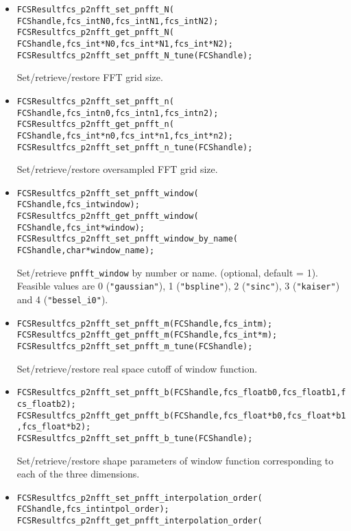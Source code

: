 \begin{itemize}
  \item
\begin{alltt}
FCSResult fcs_p2nfft_set_pnfft_N(
    FCS handle, fcs_int N0, fcs_int N1, fcs_int N2);
FCSResult fcs_p2nfft_get_pnfft_N(
    FCS handle, fcs_int* N0, fcs_int* N1, fcs_int* N2);
FCSResult fcs_p2nfft_set_pnfft_N_tune(FCS handle);
\end{alltt}
    Set/retrieve/restore FFT grid size.
  \item
\begin{alltt}
FCSResult fcs_p2nfft_set_pnfft_n(
    FCS handle, fcs_int n0, fcs_int n1, fcs_int n2);
FCSResult fcs_p2nfft_get_pnfft_n(
    FCS handle, fcs_int* n0, fcs_int* n1, fcs_int* n2);
FCSResult fcs_p2nfft_set_pnfft_n_tune(FCS handle);
\end{alltt}
    Set/retrieve/restore oversampled FFT grid size.
  \item
\begin{alltt}
FCSResult fcs_p2nfft_set_pnfft_window(
    FCS handle, fcs_int window);
FCSResult fcs_p2nfft_get_pnfft_window(
    FCS handle, fcs_int* window);
FCSResult fcs_p2nfft_set_pnfft_window_by_name(
    FCS handle, char* window_name );
\end{alltt}
    Set/retrieve \verb!pnfft_window! by number or name. (optional, default = 1).
    Feasible values are 0 (\verb!"gaussian"!), 1 (\verb!"bspline"!), 2 (\verb!"sinc"!), 3 (\verb!"kaiser"!) and 4 (\verb!"bessel_i0"!).
  \item
\begin{alltt}
FCSResult fcs_p2nfft_set_pnfft_m(FCS handle, fcs_int m);
FCSResult fcs_p2nfft_get_pnfft_m(FCS handle, fcs_int* m);
FCSResult fcs_p2nfft_set_pnfft_m_tune(FCS handle);
\end{alltt}
    Set/retrieve/restore real space cutoff of window function.
  \item
\begin{alltt}
FCSResult fcs_p2nfft_set_pnfft_b(FCS handle, fcs_float b0, fcs_float b1, fcs_float b2);
FCSResult fcs_p2nfft_get_pnfft_b(FCS handle, fcs_float* b0, fcs_float* b1, fcs_float* b2);
FCSResult fcs_p2nfft_set_pnfft_b_tune(FCS handle);
\end{alltt}
    Set/retrieve/restore shape parameters of window function corresponding to each of the three dimensions.
  \item
\begin{alltt}
FCSResult fcs_p2nfft_set_pnfft_interpolation_order(
    FCS handle, fcs_int intpol_order);
FCSResult fcs_p2nfft_get_pnfft_interpolation_order(

\end{alltt}
\end{itemize}
